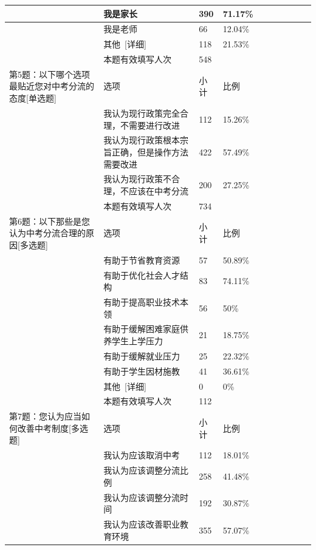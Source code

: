 \documentclass[12pt,UTF8]{ctexart}
\begin{document}
{\begin{spacing}{01}
\begin{longtable}{p{3.5cm}p{2cm}p{1.5cm}p{1.5cm}p{1.5cm}p{1.5cm}p{1.5cm}p{1cm}}
			~ & 我是家长 & 390 & 71.17\% & ~ & ~ & ~ & ~ \\ \hline
			~ & 我是老师 & 66 & 12.04\% & ~ & ~ & ~ & ~ \\ \hline
			~ & 其他 [详细] & 118 & 21.53\% & ~ & ~ & ~ & ~ \\ \hline
			~ & 本题有效填写人次 & 548 & ~ & ~ & ~ & ~ & ~ \\ \hline
			第5题：以下哪个选项最贴近您对中考分流的态度[单选题] & 选项 & 小计 & 比例 & ~ & ~ & ~ & ~ \\ \hline
			~ & 我认为现行政策完全合理，不需要进行改进 & 112 & 15.26\% & ~ & ~ & ~ & ~ \\ \hline
			~ & 我认为现行政策根本宗旨正确，但是操作方法需要改进 & 422 & 57.49\% & ~ & ~ & ~ & ~ \\ \hline
			~ & 我认为现行政策不合理，不应该在中考分流 & 200 & 27.25\% & ~ & ~ & ~ & ~ \\ \hline
			~ & 本题有效填写人次 & 734 & ~ & ~ & ~ & ~ & ~ \\ \hline
			第6题：以下那些是您认为中考分流合理的原因[多选题] & 选项 & 小计 & 比例 & ~ & ~ & ~ & ~ \\ \hline
			~ & 有助于节省教育资源 & 57 & 50.89\% & ~ & ~ & ~ & ~ \\ \hline
			~ & 有助于优化社会人才结构 & 83 & 74.11\% & ~ & ~ & ~ & ~ \\ \hline
			~ & 有助于提高职业技术本领 & 56 & 50\% & ~ & ~ & ~ & ~ \\ \hline
			~ & 有助于缓解困难家庭供养学生上学压力 & 21 & 18.75\% & ~ & ~ & ~ & ~ \\ \hline
			~ & 有助于缓解就业压力 & 25 & 22.32\% & ~ & ~ & ~ & ~ \\ \hline
			~ & 有助于学生因材施教 & 41 & 36.61\% & ~ & ~ & ~ & ~ \\ \hline
			~ & 其他 [详细] & 0 & 0\% & ~ & ~ & ~ & ~ \\ \hline
			~ & 本题有效填写人次 & 112 & ~ & ~ & ~ & ~ & ~ \\ \hline
			第7题：您认为应当如何改善中考制度[多选题] & 选项 & 小计 & 比例 & ~ & ~ & ~ & ~ \\ \hline
			~ & 我认为应该取消中考 & 112 & 18.01\% & ~ & ~ & ~ & ~ \\ \hline
			~ & 我认为应该调整分流比例 & 258 & 41.48\% & ~ & ~ & ~ & ~ \\ \hline
			~ & 我认为应该调整分流时间 & 192 & 30.87\% & ~ & ~ & ~ & ~ \\ \hline
			~ & 我认为应该改善职业教育环境 & 355 & 57.07\% & ~ & ~ & ~ & ~ \\ \hline

\end{longtable}
\end{spacing}}
\end{document}
